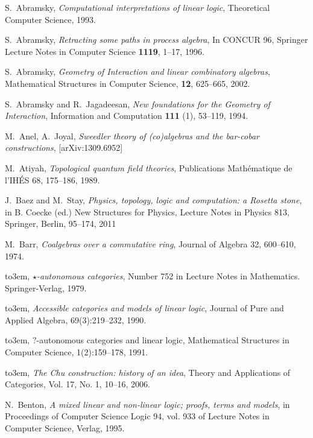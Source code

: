 \documentclass[english,letter paper,12pt,reqno]{article}
\theoremstyle{example}
\numberwithin{equation}{section}
\begin{document}

\providecommand{\bysame}{\leavevmode\hbox to3em{\hrulefill}\thinspace}
\providecommand{\href}[2]{#2}
\begin{thebibliography}{BHLS03}

S.~Abramsky, \textsl{Computational interpretations of linear logic}, Theoretical Computer Science, 1993.

S.~Abramsky, \textsl{Retracting some paths in process algebra}, In CONCUR 96, Springer Lecture Notes in Computer Science \textbf{1119}, 1--17, 1996.

S.~Abramsky, \textsl{Geometry of {I}nteraction and linear combinatory algebras}, Mathematical Structures in Computer Science, \textbf{12}, 625--665, 2002.

S.~Abramsky and R.~Jagadeesan, \textsl{New foundations for the {G}eometry of {I}nteraction}, Information and Computation \textbf{111} (1), 53--119, 1994.

M.~Anel, A.~Joyal, \textsl{Sweedler theory of (co)algebras and the bar-cobar constructions}, \href{http://arxiv.org/abs/1309.6952}{[arXiv:1309.6952]}

M.~Atiyah, \textsl{Topological quantum field theories}, Publications Math\'{e}matique de l'IH\'{E}S 68, 175--186, 1989.

J.~Baez and M.~Stay, \textsl{Physics, topology, logic and computation: a Rosetta stone}, in B. Coecke (ed.) New Structures for Physics, Lecture Notes in Physics 813, Springer, Berlin, 95--174, 2011

M.~Barr, \textsl{Coalgebras over a commutative ring}, Journal of Algebra 32, 600--610, 1974.

\bysame, \textsl{$\star$-autonomous categories}, Number 752 in Lecture Notes in Mathematics. Springer-Verlag, 1979.

\bysame, \textsl{Accessible categories and models of linear logic}, Journal of Pure and Applied Algebra, 69(3):219--232, 1990.

\bysame, {$?$-autonomous categories and linear logic}, Mathematical Structures in Computer Science, 1(2):159--178, 1991.

\bysame, \textsl{The {C}hu construction: history of an idea}, Theory and Applications of Categories, Vol. 17, No. 1, 10--16, 2006.

N.~Benton, \textsl{A mixed linear and non-linear logic; proofs, terms and models}, in Proceedings of Computer Science Logic 94, vol. 933 of Lecture Notes in Computer Science, Verlag, 1995.


\end{thebibliography}
\end{document}
